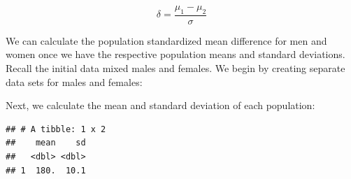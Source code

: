 \documentclass[
]{krantz}
\makeatletter
\newenvironment{Shaded}{\begin{snugshade}}{\end{snugshade}}
\newcommand{\DataTypeTok}[1]{\textcolor[rgb]{0.27,0.27,0.27}{#1}}
\newcommand{\KeywordTok}[1]{\textcolor[rgb]{0.27,0.27,0.27}{\textbf{#1}}}
\newcommand{\NormalTok}[1]{#1}
\newcommand{\OperatorTok}[1]{\textcolor[rgb]{0.43,0.43,0.43}{\textbf{#1}}}
\newcommand{\StringTok}[1]{\textcolor[rgb]{0.5,0.5,0.5}{#1}}
\newenvironment{kframe}{%
\medskip{}
\setlength{\fboxsep}{.8em}
 \def\at@end@of@kframe{}%
 \ifinner\ifhmode%
  \def\at@end@of@kframe{\end{minipage}}%
  \begin{minipage}{\columnwidth}%
 \fi\fi%
 \def\FrameCommand##1{\hskip\@totalleftmargin \hskip-\fboxsep
 \colorbox{shadecolor}{##1}\hskip-\fboxsep
     \hskip-\linewidth \hskip-\@totalleftmargin \hskip\columnwidth}%
 \MakeFramed {\advance\hsize-\width
   \@totalleftmargin\z@ \linewidth\hsize
   \@setminipage}}%
 {\par\unskip\endMakeFramed%
 \at@end@of@kframe}
\renewenvironment{Shaded}{\begin{kframe}}{\end{kframe}}
\makeatother
\begin{document}
\begin{equation} 
\delta  = \frac{\mu_{1} - \mu_{2}}{\sigma} 
      \label{eq:popsmdch5}
\end{equation}

We can calculate the population standardized mean difference for men and women once we have the respective population means and standard deviations. Recall the initial data mixed males and females. We begin by creating separate data sets for males and females:

\begin{Shaded}
\end{Shaded}

Next, we calculate the mean and standard deviation of each population:

\begin{Shaded}
\end{Shaded}

\begin{verbatim}
## # A tibble: 1 x 2
##    mean    sd
##   <dbl> <dbl>
## 1  180.  10.1
\end{verbatim}

\begin{Shaded}
\end{Shaded}
\end{document}
